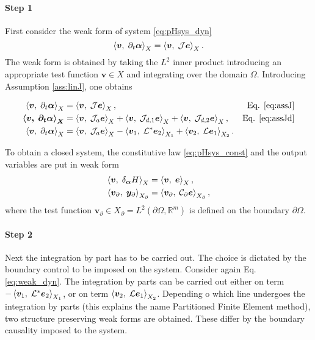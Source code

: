 \paragraph{Step 1} First consider the weak form of system \eqref{eq:pHsys_dyn}
\begin{equation}
\inner[X]{\bm{v}}{\partial_t \bm{\alpha}} = \inner[X]{\bm{v}}{\mathcal{J} \bm{e}}.
\end{equation}
The weak form is obtained by taking the $L^2$ inner product introducing an appropriate test function $\bm{v} \in X$ and integrating over the domain $\Omega$. Introducing Assumption \ref{ass:linJ}, one obtains

\begin{align}
\inner[X]{\bm{v}}{\partial_t \bm{\alpha}} &= \inner[X]{\bm{v}}{\mathcal{J} \bm{e}}, &\text{Eq. \eqref{eq:assJ}}\\
\bm{\inner[X]{\bm{v}}{\partial_t \bm{\alpha}}} &= \inner[X]{\bm{v}}{\mathcal{J}_a\bm{e}} + \inner[X]{\bm{v}}{\mathcal{J}_{d, 1}\bm{e}} + \inner[X]{\bm{v}}{\mathcal{J}_{d, 2} \bm{e}}, &\text{Eq. \eqref{eq:assJd}} \\
\inner[X]{\bm{v}}{\partial_t \bm{\alpha}} &=  \inner[X]{\bm{v}}{\mathcal{J}_a\bm{e}} -  \inner[X_1]{\bm{v}_1}{\mathcal{L}^*\bm{e}_2} + \inner[X_2]{\bm{v}_2}{\mathcal{L}\bm{e}_1}. \label{eq:weak_dyn}
\end{align}

To obtain a closed system, the constitutive law \eqref{eq:pHsys_const} and the output variables are put in weak form
\begin{align}
\inner[X]{\bm{v}}{\delta_{\bm{\alpha}} H} &= \inner[X]{\bm{v}}{\bm{e}}, \\
\inner[X_\partial]{\bm{v}_\partial}{\bm{y}_\partial} &= \inner[X_\partial]{\bm{v}_\partial}{\mathcal{C}_\partial \bm{e}},
\end{align}
where the test function $\bm{v}_\partial \in X_\partial = L^2(\partial \Omega, \mathbb{R}^m)$ is defined on the boundary $\partial\Omega$.

\paragraph{Step 2} Next the integration by part has to be carried out. The choice is dictated by the boundary control to be imposed on the system. Consider again Eq. \eqref{eq:weak_dyn}. The integration by parts can be carried out either on term $-\inner[X_1]{\bm{v}_1}{\mathcal{L}^*\bm{e}_2}$, or on term $\inner[X_2]{\bm{v}_2}{\mathcal{L}\bm{e}_1}$. Depending o which line undergoes the integration by parts (this explains the name Partitioned Finite Element method), two structure preserving weak forms are obtained. These differ by the boundary causality imposed to the system. 

